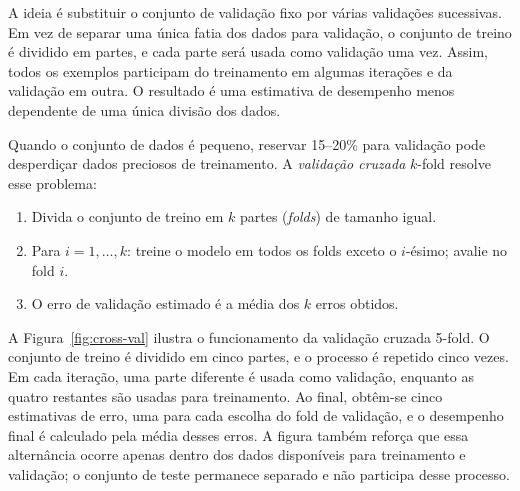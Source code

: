 \documentclass[12pt,a4paper]{article}
\begin{document}
A ideia é substituir o conjunto de validação fixo por várias validações sucessivas. Em vez de separar uma única fatia dos dados para validação, o conjunto de treino é dividido em partes, e cada parte será usada como validação uma vez. Assim, todos os exemplos participam do treinamento em algumas iterações e da validação em outra. O resultado é uma estimativa de desempenho menos dependente de uma única divisão dos dados.

Quando o conjunto de dados é pequeno, reservar 15--20\% para validação pode desperdiçar dados preciosos de treinamento. A \emph{validação cruzada} $k$-fold resolve esse problema:

\begin{enumerate}
    \item Divida o conjunto de treino em $k$ partes (\textit{folds}) de tamanho igual.
    \item Para $i = 1, \ldots, k$: treine o modelo em todos os folds exceto o $i$-ésimo; avalie no fold $i$.
    \item O erro de validação estimado é a média dos $k$ erros obtidos.
\end{enumerate}

A Figura~\ref{fig:cross-val} ilustra o funcionamento da validação cruzada 5-fold. O conjunto de treino é dividido em cinco partes, e o processo é repetido cinco vezes. Em cada iteração, uma parte diferente é usada como validação, enquanto as quatro restantes são usadas para treinamento. Ao final, obtêm-se cinco estimativas de erro, uma para cada escolha do fold de validação, e o desempenho final é calculado pela média desses erros. A figura também reforça que essa alternância ocorre apenas dentro dos dados disponíveis para treinamento e validação; o conjunto de teste permanece separado e não participa desse processo.
\end{document}

